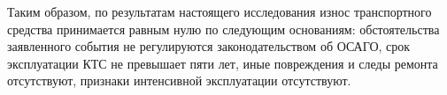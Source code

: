 



\par Таким образом, по результатам  настоящего исследования износ транспортного средства принимается равным нулю по следующим основаниям: обстоятельства заявленного события не регулируются законодательством об ОСАГО,  срок эксплуатации КТС не превышает пяти лет, иные повреждения и следы ремонта отсутствуют, признаки интенсивной эксплуатации отсутствуют.


